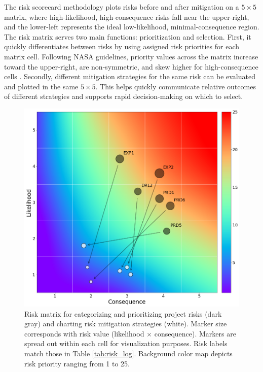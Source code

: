 The risk scorecard methodology plots risks before and after mitigation on a $5\times5$ matrix, where high-likelihood, high-consequence risks fall near the upper-right, and the lower-left represents the ideal low-likelihood, minimal-consequence region. The risk matrix serves two main functions: prioritization and selection. First, it quickly differentiates between risks by using assigned risk priorities for each matrix cell. Following NASA guidelines, priority values across the matrix increase toward the upper-right, are non-symmetric, and skew higher for high-consequence cells \citep{nasa_s3001_2017}. Secondly, different mitigation strategies for the same risk can be evaluated and plotted in the same $5\times5$. This helps quickly communicate relative outcomes of different strategies and supports rapid decision-making on which to select.

\begin{figure}%
\centering
\includegraphics[width=\linewidth]{templates/images/Figure-Risk_Matrix.png}
\caption[Geothermal project risk matrix]{Risk matrix for categorizing and prioritizing project risks (dark gray) and charting risk mitigation strategies (white). Marker size corresponds with risk value (likelihood $\times$ consequence). Markers are spread out within each cell for visualization purposes. Risk labels match those in Table \ref{tab:risk_log}. Background color map depicts risk priority ranging from 1 to 25.}
\label{fig:risk_matrix}
\end{figure}

